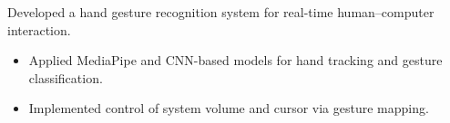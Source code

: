 Developed a hand gesture recognition system for real-time human–computer interaction.
\begin{itemize}
\item Applied MediaPipe and CNN-based models for hand tracking and gesture classification.
\item Implemented control of system volume and cursor via gesture mapping.
\end{itemize}
{\LaTeXraggedright
{}
\par}